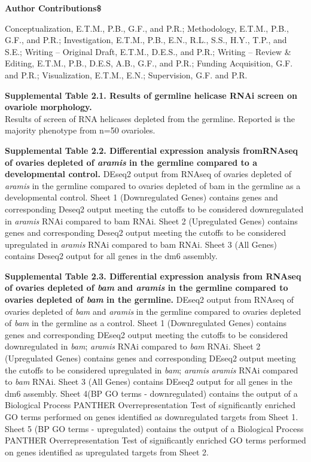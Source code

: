 \documentclass[12pt,oneside]{reedthesis}
\begin{document}
\textbf{Author Contributions\$}

Conceptualization, E.T.M., P.B., G.F., and P.R.; Methodology, E.T.M., P.B., G.F., and P.R.; Investigation, E.T.M., P.B., E.N., R.L., S.S., H.Y., T.P., and S.E.; Writing -- Original Draft, E.T.M., D.E.S., and P.R.; Writing -- Review \& Editing, E.T.M., P.B., D.E.S, A.B., G.F., and P.R.; Funding Acquisition, G.F. and P.R.; Visualization, E.T.M., E.N.; Supervision, G.F. and P.R.

\textbf{\hfill\break
}

\textbf{Supplemental Table 2.1. Results of germline helicase RNAi screen on ovariole morphology.}\\
Results of screen of RNA helicases depleted from the germline. Reported is the majority phenotype from n=50 ovarioles.

\textbf{\hfill\break
}

\textbf{Supplemental Table 2.2. Differential expression analysis fromRNAseq of ovaries depleted of \emph{aramis} in the germline compared to a developmental control.} DEseq2 output from RNAseq of ovaries depleted of \emph{aramis} in the germline compared to ovaries depleted of bam in the germline as a developmental control. Sheet 1 (Downregulated Genes) contains genes and corresponding Deseq2 output meeting the cutoffs to be considered downregulated in \emph{aramis} RNAi compared to bam RNAi. Sheet 2 (Upregulated Genes) contains genes and corresponding Deseq2 output meeting the cutoffs to be considered upregulated in \emph{aramis} RNAi compared to bam RNAi. Sheet 3 (All Genes) contains Deseq2 output for all genes in the dm6 assembly.

\textbf{Supplemental Table 2.3. Differential expression analysis from RNAseq of ovaries depleted of \emph{bam} and \emph{aramis} in the germline compared to ovaries depleted of \emph{bam} in the germline.} DEseq2 output from RNAseq of ovaries depleted of \emph{bam} and \emph{aramis} in the germline compared to ovaries depleted of \emph{bam} in the germline as a control. Sheet 1 (Downregulated Genes) contains genes and corresponding DEseq2 output meeting the cutoffs to be considered downregulated in \emph{bam}; \emph{aramis} RNAi compared to \emph{bam} RNAi. Sheet 2 (Upregulated Genes) contains genes and corresponding DEseq2 output meeting the cutoffs to be considered upregulated in \emph{bam}; \emph{aramis} \emph{aramis} RNAi compared to \emph{bam} RNAi. Sheet 3 (All Genes) contains DEseq2 output for all genes in the dm6 assembly. Sheet 4(BP GO terms - downregulated) contains the output of a Biological Process PANTHER Overrepresentation Test of significantly enriched GO terms performed on genes identified as downregulated targets from Sheet 1. Sheet 5 (BP GO terms - upregulated) contains the output of a Biological Process PANTHER Overrepresentation Test of significantly enriched GO terms performed on genes identified as upregulated targets from Sheet 2.
\end{document}
